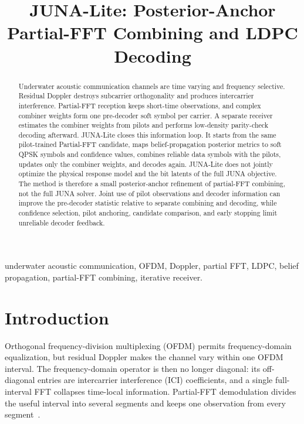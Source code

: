 \documentclass[conference]{IEEEtran}
\title{JUNA-Lite: Posterior-Anchor Partial-FFT Combining and LDPC Decoding}
\author{\IEEEauthorblockN{Gabriel Chua Yu Han}}
\begin{document}
\maketitle

\begin{abstract}
Underwater acoustic communication channels are time varying and frequency
selective.  Residual Doppler destroys subcarrier orthogonality and produces
intercarrier interference.  Partial-FFT reception keeps short-time
observations, and complex combiner weights form one pre-decoder soft symbol
per carrier.  A separate receiver estimates the combiner weights from pilots
and performs low-density parity-check decoding afterward.  JUNA-Lite closes
this information loop.  It starts from the same pilot-trained Partial-FFT
candidate, maps belief-propagation posterior metrics to soft QPSK symbols and
confidence values, combines reliable data symbols with the pilots, updates only the
combiner weights, and decodes again.  JUNA-Lite does not jointly optimize
the physical response model and the bit latents of the full JUNA objective.
The method is therefore a small posterior-anchor refinement of
partial-FFT combining, not the full JUNA solver.  Joint use of pilot observations
and decoder information can improve the pre-decoder statistic relative to
separate combining and decoding, while confidence selection, pilot anchoring,
candidate comparison, and early stopping limit unreliable decoder feedback.
\end{abstract}

\begin{IEEEkeywords}
underwater acoustic communication, OFDM, Doppler, partial FFT, LDPC, belief
propagation, partial-FFT combining, iterative receiver.
\end{IEEEkeywords}

\section{Introduction}

Orthogonal frequency-division multiplexing (OFDM) permits frequency-domain
equalization, but residual Doppler makes the channel vary within one OFDM
interval.  The frequency-domain operator is then no longer diagonal: its
off-diagonal entries are intercarrier interference (ICI) coefficients, and a
single full-interval FFT collapses time-local information.  Partial-FFT
demodulation divides the useful interval into several segments and keeps one
observation from every segment~\cite{yerramalli}.
\end{document}

